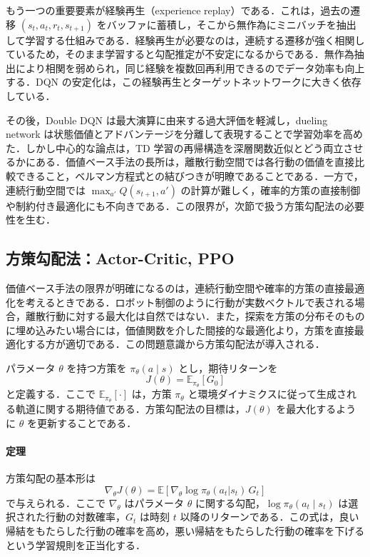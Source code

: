 もう一つの重要要素が経験再生（experience replay）である．これは，過去の遷移 $(s_t,a_t,r_t,s_{t+1})$ をバッファに蓄積し，そこから無作為にミニバッチを抽出して学習する仕組みである．経験再生が必要なのは，連続する遷移が強く相関しているため，そのまま学習すると勾配推定が不安定になるからである．無作為抽出により相関を弱められ，同じ経験を複数回再利用できるのでデータ効率も向上する．DQN の安定化は，この経験再生とターゲットネットワークに大きく依存している．

その後，Double DQN は最大演算に由来する過大評価を軽減し，dueling network は状態価値とアドバンテージを分離して表現することで学習効率を高めた．しかし中心的な論点は，TD 学習の再帰構造を深層関数近似とどう両立させるかにある．価値ベース手法の長所は，離散行動空間では各行動の価値を直接比較できること，ベルマン方程式との結びつきが明瞭であることである．一方で，連続行動空間では $\max_{a'} Q(s_{t+1},a')$ の計算が難しく，確率的方策の直接制御や制約付き最適化にも不向きである．この限界が，次節で扱う方策勾配法の必要性を生む．

\subsection{方策勾配法：Actor-Critic, PPO}

価値ベース手法の限界が明確になるのは，連続行動空間や確率的方策の直接最適化を考えるときである．ロボット制御のように行動が実数ベクトルで表される場合，離散行動に対する最大化は自然ではない．また，探索を方策の分布そのものに埋め込みたい場合には，価値関数を介した間接的な最適化より，方策を直接最適化する方が適切である．この問題意識から方策勾配法が導入される．

パラメータ $\theta$ を持つ方策を $\pi_\theta(a \mid s)$ とし，期待リターンを
\begin{equation}
J(\theta) = \mathbb{E}_{\pi_\theta}[G_0]
\end{equation}
と定義する．ここで $\mathbb{E}_{\pi_\theta}[\cdot]$ は，方策 $\pi_\theta$ と環境ダイナミクスに従って生成される軌道に関する期待値である．方策勾配法の目標は，$J(\theta)$ を最大化するように $\theta$ を更新することである．

\paragraph*{定理}
方策勾配の基本形は
\begin{equation}
\nabla_\theta J(\theta) = \mathbb{E}\left[\nabla_\theta \log \pi_\theta(a_t|s_t)\, G_t\right]
\end{equation}
で与えられる\cite{Williams1992}．ここで $\nabla_\theta$ はパラメータ $\theta$ に関する勾配，$\log \pi_\theta(a_t \mid s_t)$ は選択された行動の対数確率，$G_t$ は時刻 $t$ 以降のリターンである．この式は，良い帰結をもたらした行動の確率を高め，悪い帰結をもたらした行動の確率を下げるという学習規則を正当化する．

